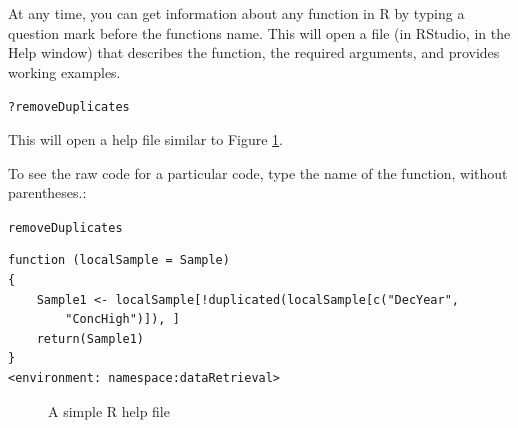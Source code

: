\documentclass[a4paper,11pt]{article}\usepackage[]{graphicx}\usepackage[]{color}
\makeatletter
\newcommand{\hlopt}[1]{\textcolor[rgb]{0,0,0}{#1}}%
\newcommand{\hlstd}[1]{\textcolor[rgb]{0.345,0.345,0.345}{#1}}%
\newenvironment{kframe}{%
 \def\at@end@of@kframe{}%
 \ifinner\ifhmode%
  \def\at@end@of@kframe{\end{minipage}}%
  \begin{minipage}{\columnwidth}%
 \fi\fi%
 \def\FrameCommand##1{\hskip\@totalleftmargin \hskip-\fboxsep
 \colorbox{shadecolor}{##1}\hskip-\fboxsep
     \hskip-\linewidth \hskip-\@totalleftmargin \hskip\columnwidth}%
 \MakeFramed {\advance\hsize-\width
   \@totalleftmargin\z@ \linewidth\hsize
   \@setminipage}}%
 {\par\unskip\endMakeFramed%
 \at@end@of@kframe}
\newenvironment{knitrout}{}{} %
\makeatother
\begin{document}
At any time, you can get information about any function in R by typing a question mark before the functions name.  This will open a file (in RStudio, in the Help window) that describes the function, the required arguments, and provides working examples.

\begin{knitrout}
\color{fgcolor}\begin{kframe}
\begin{alltt}
\hlopt{?}\hlstd{removeDuplicates}
\end{alltt}
\end{kframe}
\end{knitrout}


This will open a help file similar to Figure \ref{fig:help}.

\FloatBarrier

To see the raw code for a particular code, type the name of the function, without parentheses.:
\begin{knitrout}
\color{fgcolor}\begin{kframe}
\begin{alltt}
\hlstd{removeDuplicates}
\end{alltt}
\begin{verbatim}
function (localSample = Sample) 
{
    Sample1 <- localSample[!duplicated(localSample[c("DecYear", 
        "ConcHigh")]), ]
    return(Sample1)
}
<environment: namespace:dataRetrieval>
\end{verbatim}
\end{kframe}
\end{knitrout}




\begin{figure}[ht!]
\centering
\caption{A simple R help file}
\label{fig:help}
\end{figure}
\end{document}
